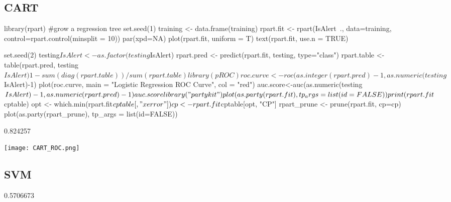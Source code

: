 \documentclass[11pt]{article}
\begin{document}
\subsection{CART}
\begin{Schunk}
\begin{Sinput}
library(rpart) #grow a regression tree
set.seed(1)
training <- data.frame(training)
rpart.fit <- rpart(IsAlert~., data=training, control=rpart.control(minsplit = 10))
par(xpd=NA)
plot(rpart.fit, uniform = T)
text(rpart.fit, use.n = TRUE)

set.seed(2)
testing$IsAlert <- as.factor(testing$IsAlert)
rpart.pred <- predict(rpart.fit, testing, type="class")
rpart.table <- table(rpart.pred, testing$IsAlert)
1-sum(diag(rpart.table))/sum(rpart.table)

library(pROC)
roc.curve <- roc(as.integer(rpart.pred)-1, as.numeric(testing$IsAlert)-1)
plot(roc.curve, main = "Logistic Regression ROC Curve", col = "red")
auc.score<-auc(as.numeric(testing$IsAlert)-1, as.numeric(rpart.pred)-1)
auc.score

library("partykit")
plot(as.party(rpart.fit), tp_args = list(id=FALSE))
print(rpart.fit$cptable)
opt <- which.min(rpart.fit$cptable[,"xerror"])
cp <- rpart.fit$cptable[opt, "CP"]
rpart_prune <- prune(rpart.fit, cp=cp)
plot(as.party(rpart_prune), tp_args = list(id=FALSE))
\end{Sinput}
\begin{Soutput}
[1] 0.824257
\end{Soutput}
\end{Schunk}

\texttt{[image: CART\_ROC.png]}  

\subsection{SVM}
\begin{Schunk}
\begin{Soutput}
[1] 0.5706673
\end{Soutput}
\end{Schunk}
\end{document}
